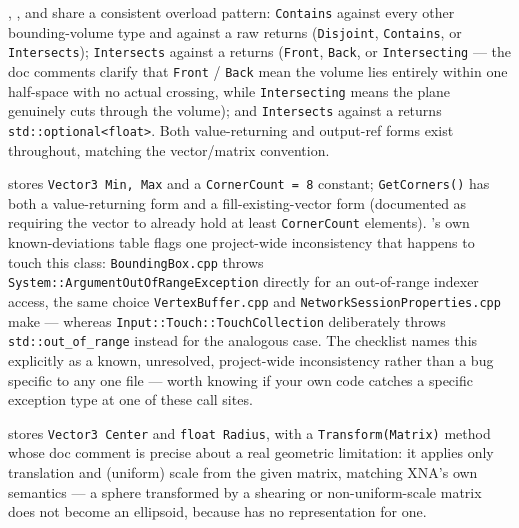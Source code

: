 , , and  share a
consistent overload pattern: \texttt{Contains} against every other bounding-volume type and
against a raw  returns  (\texttt{Disjoint},
\texttt{Contains}, or \texttt{Intersects}); \texttt{Intersects} against a 
returns  (\texttt{Front}, \texttt{Back}, or
\texttt{Intersecting} --- the doc comments clarify that \texttt{Front} / \texttt{Back} mean
the volume lies entirely within one half-space with no actual crossing, while
\texttt{Intersecting} means the plane genuinely cuts through the volume); and
\texttt{Intersects} against a  returns \texttt{std::optional<float>}. Both
value-returning and output-ref forms exist throughout, matching the vector/matrix convention.

 stores \texttt{Vector3 Min, Max} and a \texttt{CornerCount = 8}
constant; \texttt{GetCorners()} has both a value-returning form and a fill-existing-vector
form (documented as requiring the vector to already hold at least \texttt{CornerCount}
elements). 's own known-deviations table flags one project-wide
inconsistency that happens to touch this class: \texttt{BoundingBox.cpp} throws
\texttt{System::ArgumentOutOfRangeException} directly for an out-of-range indexer access, the
same choice \texttt{VertexBuffer.cpp} and \texttt{NetworkSessionProperties.cpp} make ---
whereas \texttt{Input::Touch::TouchCollection} deliberately throws \texttt{std::out\_of\_range}
instead for the analogous case. The checklist names this explicitly as a known, unresolved,
project-wide inconsistency rather than a bug specific to any one file --- worth knowing if
your own code catches a specific exception type at one of these call sites.

 stores \texttt{Vector3 Center} and \texttt{float Radius}, with a
\texttt{Transform(Matrix)} method whose doc comment is precise about a real geometric
limitation: it applies only translation and (uniform) scale from the given matrix, matching
XNA's own semantics --- a sphere transformed by a shearing or non-uniform-scale matrix does
not become an ellipsoid, because  has no representation for one.

